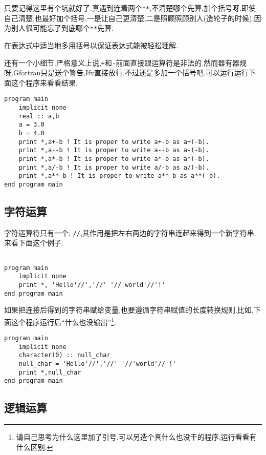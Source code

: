 只要记得这里有个坑就好了.真遇到连着两个\texttt{**},不清楚哪个先算,加个括号呀.即使自己清楚,也最好加个括号,一是让自己更清楚,二是照顾照顾别人(造轮子的时候),因为别人很可能忘了到底哪个\texttt{**}先算.

\begin{convention}\label{use_barket}
    在表达式中适当地多用括号以保证表达式能被轻松理解.
\end{convention}

还有一个小细节.严格意义上说,\texttt{+}和\texttt{-}前面直接跟运算符是非法的.然而器有器规呀,Gfortran只是送个警告,Ifx直接放行.不过还是多加一个括号吧.可以运行运行下面这个程序来看看结果.
\begin{lstlisting}
program main
    implicit none
    real :: a,b
    a = 3.0
    b = 4.0
    print *,a+-b ! It is proper to write a+-b as a+(-b).
    print *,a--b ! It is proper to write a--b as a-(-b).
    print *,a*-b ! It is proper to write a*-b as a*(-b).
    print *,a/-b ! It is proper to write a/-b as a/(-b).
    print *,a**-b ! It is proper to write a**-b as a**(-b).
end program main
\end{lstlisting}

\subsection{字符运算}

字符运算符只有一个: \texttt{//},其作用是把左右两边的字符串连起来得到一个新字符串.来看下面这个例子.
\begin{lstlisting}

program main
    implicit none
    print *, 'Hello'//','//' '//'world'//'!'
end program main
\end{lstlisting}

如果把连接后得到的字符串赋给变量,也要遵循字符串赋值的长度转换规则.比如,下面这个程序运行后``什么也没输出''\footnote{
    请自己思考为什么这里加了引号.可以另造个真什么也没干的程序,运行看看有什么区别.
}.
\begin{lstlisting}
program main
    implicit none
    character(0) :: null_char
    null_char = 'Hello'//','//' '//'world'//'!'
    print *,null_char
end program main
\end{lstlisting}

\subsection{逻辑运算}

